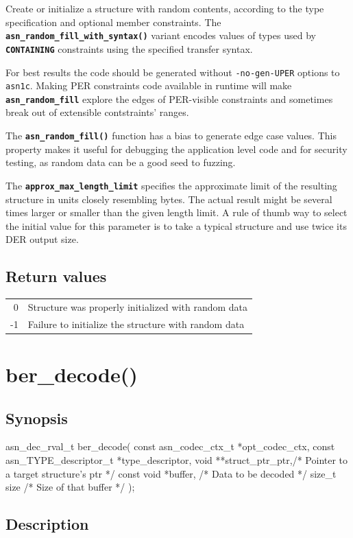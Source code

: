 \documentclass[english,oneside,12pt]{book}
\newcommand{\apisection}[2]{\clearpage\section{\label{#1}#2}}
\newcommand{\code}[1]{\texttt{\textbf{\lstinline{#1}}}}
\newcommand{\cmd}[1]{\texttt{#1}}
\begin{document}
Create or initialize a structure with random contents, according to the type
specification and optional member constraints.
The \code{asn_random_fill_with_syntax()} variant encodes values of types used
by \code{CONTAINING} constraints using the specified transfer syntax.

For best results the code should be generated without \cmd{-no-gen-UPER}
options to \cmd{asn1c}. Making PER constraints code available in runtime
will make \code{asn_random_fill} explore the edges of PER-visible constraints
and sometimes break out of extensible contstraints' ranges.

The \code{asn_random_fill()} function has a bias to generate edge case
values. This property makes it useful for debugging the application level
code and for security testing, as random data can be a good seed to fuzzing.

The \code{approx_max_length_limit} specifies the approximate limit of the
resulting structure in units closely resembling bytes. The actual result
might be several times larger or smaller than the given length limit.
A rule of thumb way to select the initial value for this parameter
is to take a typical structure and use twice its DER output size.

\subsection*{Return values}

\begin{tabular}[h!]{rl}
0 & Structure was properly initialized with random data \\
-1 & Failure to initialize the structure with random data
\end{tabular}

\apisection{sec:ber_decode}{ber\_decode()}

\subsection*{Synopsis}
\begin{signature}
asn_dec_rval_t ber_decode(
    const asn_codec_ctx_t *opt_codec_ctx,
    const asn_TYPE_descriptor_t *type_descriptor,
    void **struct_ptr_ptr,/* Pointer to a target structure's ptr */
    const void *buffer,   /* Data to be decoded */
    size_t size           /* Size of that buffer */
);
\end{signature}

\subsection*{Description}
\end{document}
